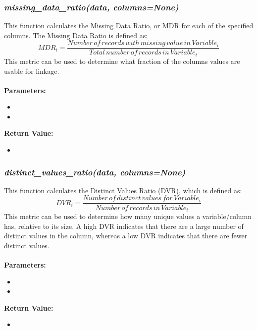 \documentclass[titlepage, 11pt]{article}
\begin{document}
\subsubsection{\textit{missing\_data\_ratio(data, columns=None)}}

This function calculates the Missing Data Ratio, or MDR for each of the specified columns. The Missing Data Ratio is defined as: 
\begin{equation}
    MDR_i = \frac{Number\, of\, records\, with\, missing\, value\, in\, Variable_i} {Total\, number\, of\, records\, in\, Variable_i}
\end{equation}
This metric can be used to determine what fraction of the columns values are usable for linkage.
\\
\\
\textbf{Parameters:}
\begin{itemize}
    \item \docdata
    \item \doccols
\end{itemize}
\textbf{Return Value:}
\begin{itemize}
    \item {}
\end{itemize}


\subsubsection{\textit{distinct\_values\_ratio(data, columns=None)}}
This function calculates the Distinct Values Ratio (DVR), which is defined as:
\begin{equation}
    DVR_i = \frac{Number\, of\, distinct\, values\, for\, Variable_i} {Number\, of\, records\, in\, Variable_i}
\end{equation}
This metric can be used to determine how many unique values a variable/column has, relative to its size. A high DVR indicates that there are a large number of distinct values in the column, whereas a low DVR indicates that there are fewer distinct values.
\\
\\
\textbf{Parameters:}
\begin{itemize}
    \item \docdata
    \item \doccols
\end{itemize}
\textbf{Return Value:}
\begin{itemize}
    \item {}
\end{itemize}
\end{document}
